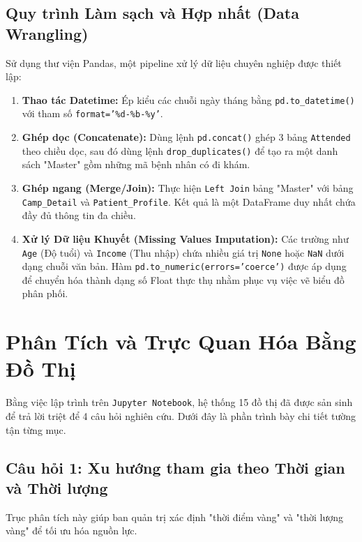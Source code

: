 \documentclass[12pt,a4paper]{article}
\begin{document}
\subsection{Quy trình Làm sạch và Hợp nhất (Data Wrangling)}
Sử dụng thư viện Pandas, một pipeline xử lý dữ liệu chuyên nghiệp được thiết lập:
\begin{enumerate}
    \item \textbf{Thao tác Datetime:} Ép kiểu các chuỗi ngày tháng bằng \texttt{pd.to\_datetime()} với tham số \texttt{format='\%d-\%b-\%y'}.
    \item \textbf{Ghép dọc (Concatenate):} Dùng lệnh \texttt{pd.concat()} ghép 3 bảng \texttt{Attended} theo chiều dọc, sau đó dùng lệnh \texttt{drop\_duplicates()} để tạo ra một danh sách "Master" gồm những mã bệnh nhân có đi khám.
    \item \textbf{Ghép ngang (Merge/Join):} Thực hiện \texttt{Left Join} bảng "Master" với bảng \texttt{Camp\_Detail} và \texttt{Patient\_Profile}. Kết quả là một DataFrame duy nhất chứa đầy đủ thông tin đa chiều.
    \item \textbf{Xử lý Dữ liệu Khuyết (Missing Values Imputation):} Các trường như \texttt{Age} (Độ tuổi) và \texttt{Income} (Thu nhập) chứa nhiều giá trị \texttt{None} hoặc \texttt{NaN} dưới dạng chuỗi văn bản. Hàm \texttt{pd.to\_numeric(errors='coerce')} được áp dụng để chuyển hóa thành dạng số Float thực thụ nhằm phục vụ việc vẽ biểu đồ phân phối.
\end{enumerate}

\section{Phân Tích và Trực Quan Hóa Bằng Đồ Thị}

Bằng việc lập trình trên \texttt{Jupyter Notebook}, hệ thống 15 đồ thị đã được sản sinh để trả lời triệt để 4 câu hỏi nghiên cứu. Dưới đây là phần trình bày chi tiết tường tận từng mục.

\subsection{Câu hỏi 1: Xu hướng tham gia theo Thời gian và Thời lượng}
Trục phân tích này giúp ban quản trị xác định "thời điểm vàng" và "thời lượng vàng" để tối ưu hóa nguồn lực.
\end{document}
